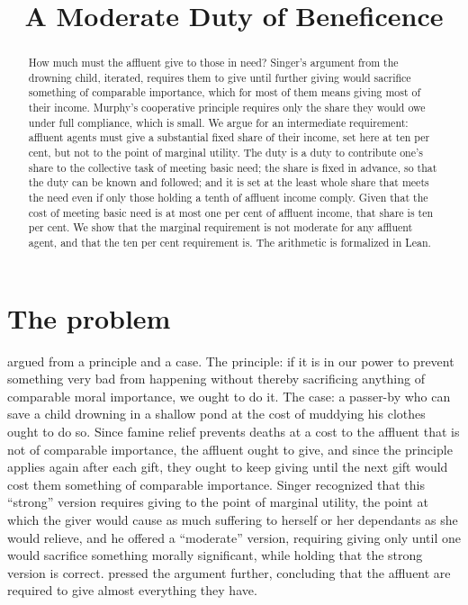 \documentclass{situationist-preprint}
\title{A Moderate Duty of Beneficence}
\begin{document}
\maketitle

\begin{abstract}
How much must the affluent give to those in need? Singer's argument from the drowning child, iterated, requires them to give until further giving would sacrifice something of comparable importance, which for most of them means giving most of their income. Murphy's cooperative principle requires only the share they would owe under full compliance, which is small. We argue for an intermediate requirement: affluent agents must give a substantial fixed share of their income, set here at ten per cent, but not to the point of marginal utility. The duty is a duty to contribute one's share to the collective task of meeting basic need; the share is fixed in advance, so that the duty can be known and followed; and it is set at the least whole share that meets the need even if only those holding a tenth of affluent income comply. Given that the cost of meeting basic need is at most one per cent of affluent income, that share is ten per cent. We show that the marginal requirement is not moderate for any affluent agent, and that the ten per cent requirement is. The arithmetic is formalized in Lean.
\end{abstract}

\section{The problem}

\citet{Singer1972} argued from a principle and a case. The principle: if it is in our power to prevent something very bad from happening without thereby sacrificing anything of comparable moral importance, we ought to do it. The case: a passer-by who can save a child drowning in a shallow pond at the cost of muddying his clothes ought to do so. Since famine relief prevents deaths at a cost to the affluent that is not of comparable importance, the affluent ought to give, and since the principle applies again after each gift, they ought to keep giving until the next gift would cost them something of comparable importance. Singer recognized that this ``strong'' version requires giving to the point of marginal utility, the point at which the giver would cause as much suffering to herself or her dependants as she would relieve, and he offered a ``moderate'' version, requiring giving only until one would sacrifice something morally significant, while holding that the strong version is correct. \citet{Unger1996} pressed the argument further, concluding that the affluent are required to give almost everything they have.
\end{document}
